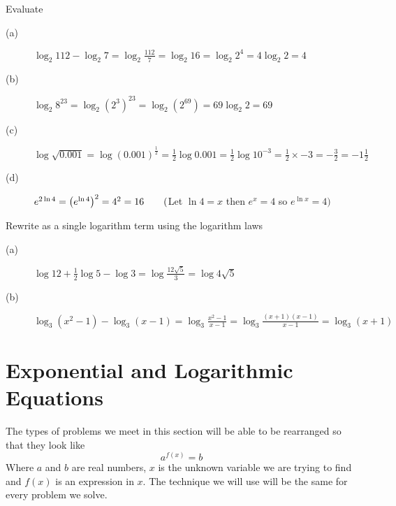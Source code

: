 \example Evaluate
\begin{description}
	\item [(a)] $\log _{2} 112 -\log _{2} 7 =\log _{2} \frac{112}{7} =\log _{2} 16 =\log _{2} 2^{4} =4 \log _{2} 2 =4$ 
	
	\item [(b)] $\log _{2} 8^{23} =\log _{2} \left (2^{3}\right )^{23} =\log _{2} \left (2^{69}\right ) =69 \log _{2} 2 =69$ 
	
	\item [(c)] $\log  \sqrt{0.001} =\log  \left (0.001\right )^{\frac{1}{2}} =\frac{1}{2} \log  0.001 =\frac{1}{2} \log  10^{ -3} =\frac{1}{2} \times  -3 = -\frac{3}{2} = -1\frac{1}{2}$ 
	
	\item [(d)] $e^{2 \ln  4} =\left (e^{\ln  4}\right )^{2} =4^{2} =16\text{\quad \quad }($Let $\ln  4 =x$ then $e^{x} =4$ so $e^{\ln  x} =4)$ \end{description}

\example Rewrite as a single logarithm term using the logarithm laws 
\begin{description}
	\item [(a)] $\log  12 +\frac{1}{2} \log  5 -\log  3 =\log  \frac{12 \sqrt{5}}{3} =\log  4 \sqrt{5}$ 
	
	\item [(b)] $\log _{3} \left (x^{2} -1\right ) -\log _{3} \left (x -1\right ) =\log _{3} \frac{x^{2} -1}{x -1} =\log _{3} \frac{\left (x +1\right ) \left (x -1\right )}{x -1} =\log _{3} \left (x +1\right )$ \end{description}



\section{Exponential and Logarithmic Equations}
The types of problems we meet in this section will be able to be rearranged so that they look like
\begin{equation*}a^{f (x)} =b
\end{equation*}
Where $a$ and $b$ are real numbers, $x$ is the unknown variable we are trying to find and $f (x)$ is an expression in $x$. The technique we will use will be the same for every problem we solve. 

